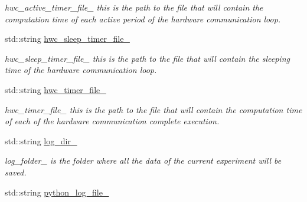 \begin{DoxyCompactItemize}
\begin{DoxyCompactList}\small\item\em hwc\+\_\+active\+\_\+timer\+\_\+file\+\_\+ this is the path to the file that will contain the computation time of each active period of the hardware communication loop. \end{DoxyCompactList}\item 
std\+::string \hyperlink{classdynamic__graph_1_1DynamicGraphManager_a5db6275d202963665a35c5eb2e68088d}{hwc\+\_\+sleep\+\_\+timer\+\_\+file\+\_\+}\hypertarget{classdynamic__graph_1_1DynamicGraphManager_a5db6275d202963665a35c5eb2e68088d}{}\label{classdynamic__graph_1_1DynamicGraphManager_a5db6275d202963665a35c5eb2e68088d}

\begin{DoxyCompactList}\small\item\em hwc\+\_\+sleep\+\_\+timer\+\_\+file\+\_\+ this is the path to the file that will contain the sleeping time of the hardware communication loop. \end{DoxyCompactList}\item 
std\+::string \hyperlink{classdynamic__graph_1_1DynamicGraphManager_a84f97c9eebbecee1af314e74fe22d8ed}{hwc\+\_\+timer\+\_\+file\+\_\+}\hypertarget{classdynamic__graph_1_1DynamicGraphManager_a84f97c9eebbecee1af314e74fe22d8ed}{}\label{classdynamic__graph_1_1DynamicGraphManager_a84f97c9eebbecee1af314e74fe22d8ed}

\begin{DoxyCompactList}\small\item\em hwc\+\_\+timer\+\_\+file\+\_\+ this is the path to the file that will contain the computation time of each of the hardware communication complete execution. \end{DoxyCompactList}\item 
std\+::string \hyperlink{classdynamic__graph_1_1DynamicGraphManager_ace11054bf618c29e4fda9a77905e8ff0}{log\+\_\+dir\+\_\+}\hypertarget{classdynamic__graph_1_1DynamicGraphManager_ace11054bf618c29e4fda9a77905e8ff0}{}\label{classdynamic__graph_1_1DynamicGraphManager_ace11054bf618c29e4fda9a77905e8ff0}

\begin{DoxyCompactList}\small\item\em log\+\_\+folder\+\_\+ is the folder where all the data of the current experiment will be saved. \end{DoxyCompactList}\item 
std\+::string \hyperlink{classdynamic__graph_1_1DynamicGraphManager_ac3be4a8d0596390bc5dd055321a7df55}{python\+\_\+log\+\_\+file\+\_\+}\hypertarget{classdynamic__graph_1_1DynamicGraphManager_ac3be4a8d0596390bc5dd055321a7df55}{}\label{classdynamic__graph_1_1DynamicGraphManager_ac3be4a8d0596390bc5dd055321a7df55}


\end{DoxyCompactItemize}
